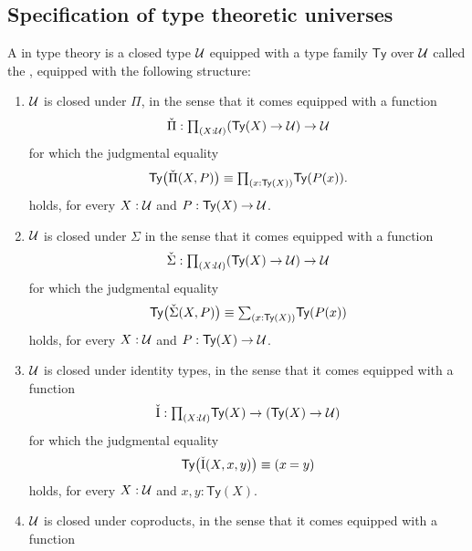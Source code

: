 \subsection{Specification of type theoretic universes}
\begin{defn}
  A  in type theory is a closed type $\mathcal{U}$ equipped with a type family $\mathsf{Ty}$ over $\mathcal{U}$ called the , equipped with the following structure:
  \begin{enumerate}
  \item $\mathcal{U}$ is closed under $\Pi$, in the sense that it comes equipped with a function
    \begin{equation*}
      \check{\Pi} :\prd{X:\UU}(\mathsf{Ty}(X)\to\UU)\to\UU
    \end{equation*}
    for which the judgmental equality
    \begin{equation*}
      \mathsf{Ty}\big(\check{\Pi}(X,P)\big)\jdeq \prd{x:\mathsf{Ty}(X)}\mathsf{Ty}(P(x)).
    \end{equation*}
    holds, for every $X:\mathcal{U}$ and $P:\mathsf{Ty}(X)\to\mathcal{U}$.
  \item $\mathcal{U}$ is closed under $\Sigma$ in the sense that it comes equipped with a function
    \begin{equation*}
      \check{\Sigma} :\prd{X:\UU}(\mathsf{Ty}(X)\to\UU)\to\UU
    \end{equation*}
    for which the judgmental equality
    \begin{equation*}
      \mathsf{Ty}\big(\check{\Sigma}(X,P)\big) \jdeq \sm{x:\mathsf{Ty}(X)}\mathsf{Ty}(P(x))
    \end{equation*}
    holds, for every $X:\mathcal{U}$ and $P:\mathsf{Ty}(X)\to\mathcal{U}$.
  \item $\mathcal{U}$ is closed under identity types, in the sense that it comes equipped with a function
    \begin{equation*}
      \check{\mathrm{I}} : \prd{X:\UU}\mathsf{Ty}(X)\to(\mathsf{Ty}(X)\to\UU)
    \end{equation*}
    for which the judgmental equality
    \begin{equation*}
      \mathsf{Ty}\big(\check{\mathrm{I}}(X,x,y)\big)\jdeq (\id{x}{y})
    \end{equation*}
    holds, for every $X:\mathcal{U}$ and $x,y:\mathsf{Ty}(X)$.
  \item $\mathcal{U}$ is closed under coproducts, in the sense that it comes equipped with a function

\end{enumerate}
\end{defn}
